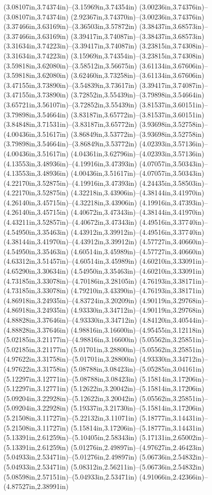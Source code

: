 (3.08107in,3.74374in)--(3.15969in,3.74354in) (3.00236in,3.74376in)--(3.08107in,3.74374in) (2.92367in,3.74370in)--(3.00236in,3.74376in) (3.37466in,3.63169in)--(3.36503in,3.57872in) (3.38437in,3.68573in)--(3.37466in,3.63169in) (3.39417in,3.74087in)--(3.38437in,3.68573in) (3.31634in,3.74223in)--(3.39417in,3.74087in) (3.23815in,3.74308in)--(3.31634in,3.74223in) (3.15969in,3.74354in)--(3.23815in,3.74308in) (3.59818in,3.62080in)--(3.58512in,3.56675in) (3.61134in,3.67606in)--(3.59818in,3.62080in) (3.62460in,3.73258in)--(3.61134in,3.67606in) (3.47155in,3.73890in)--(3.54839in,3.73617in) (3.39417in,3.74087in)--(3.47155in,3.73890in) (3.72852in,3.55439in)--(3.79898in,3.54664in) (3.65721in,3.56107in)--(3.72852in,3.55439in) (3.81537in,3.60151in)--(3.79898in,3.54664in) (3.83187in,3.65772in)--(3.81537in,3.60151in) (3.84848in,3.71531in)--(3.83187in,3.65772in) (3.93698in,3.52758in)--(4.00436in,3.51617in) (3.86849in,3.53772in)--(3.93698in,3.52758in) (3.79898in,3.54664in)--(3.86849in,3.53772in) (4.02393in,3.57136in)--(4.00436in,3.51617in) (4.04361in,3.62796in)--(4.02393in,3.57136in) (4.13553in,3.48936in)--(4.19916in,3.47393in) (4.07057in,3.50343in)--(4.13553in,3.48936in) (4.00436in,3.51617in)--(4.07057in,3.50343in) (4.22170in,3.52875in)--(4.19916in,3.47393in) (4.24435in,3.58503in)--(4.22170in,3.52875in) (4.32218in,3.43906in)--(4.38144in,3.41970in) (4.26140in,3.45715in)--(4.32218in,3.43906in) (4.19916in,3.47393in)--(4.26140in,3.45715in) (4.40672in,3.47343in)--(4.38144in,3.41970in) (4.43211in,3.52857in)--(4.40672in,3.47343in) (4.49516in,3.37740in)--(4.54950in,3.35463in) (4.43912in,3.39912in)--(4.49516in,3.37740in) (4.38144in,3.41970in)--(4.43912in,3.39912in) (4.57727in,3.40660in)--(4.54950in,3.35463in) (4.60514in,3.45989in)--(4.57727in,3.40660in) (4.63312in,3.51457in)--(4.60514in,3.45989in) (4.60210in,3.33091in)--(4.65290in,3.30634in) (4.54950in,3.35463in)--(4.60210in,3.33091in) (4.73185in,3.33078in)--(4.70186in,3.28105in) (4.76193in,3.38171in)--(4.73185in,3.33078in) (4.79210in,3.43390in)--(4.76193in,3.38171in) (4.86918in,3.24935in)--(4.83724in,3.20209in) (4.90119in,3.29768in)--(4.86918in,3.24935in) (4.93330in,3.34712in)--(4.90119in,3.29768in) (4.88828in,3.37646in)--(4.93330in,3.34712in) (4.84120in,3.40544in)--(4.88828in,3.37646in) (4.98816in,3.16600in)--(4.95455in,3.12118in) (5.02185in,3.21177in)--(4.98816in,3.16600in) (5.05562in,3.25851in)--(5.02185in,3.21177in) (5.01701in,3.28800in)--(5.05562in,3.25851in) (4.97622in,3.31758in)--(5.01701in,3.28800in) (4.93330in,3.34712in)--(4.97622in,3.31758in) (5.08788in,3.08423in)--(5.05285in,3.04161in) (5.12297in,3.12771in)--(5.08788in,3.08423in) (5.15814in,3.17206in)--(5.12297in,3.12771in) (5.12622in,3.20042in)--(5.15814in,3.17206in) (5.09204in,3.22928in)--(5.12622in,3.20042in) (5.05562in,3.25851in)--(5.09204in,3.22928in) (5.19337in,3.21730in)--(5.15814in,3.17206in) (5.21508in,3.11727in)--(5.22132in,3.11071in) (5.18777in,3.14431in)--(5.21508in,3.11727in) (5.15814in,3.17206in)--(5.18777in,3.14431in) (5.13391in,2.61259in)--(5.10405in,2.58343in) (5.17131in,2.65002in)--(5.13391in,2.61259in) (5.01276in,2.49897in)--(4.97627in,2.46423in) (5.04933in,2.53471in)--(5.01276in,2.49897in) (5.06736in,2.54832in)--(5.04933in,2.53471in) (5.08312in,2.56211in)--(5.06736in,2.54832in) (5.08598in,2.57151in)--(5.04933in,2.53471in) (4.91066in,2.42366in)--(4.87527in,2.38991in) 